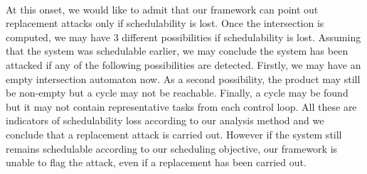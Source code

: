 ~\\
\noindent
At this onset, we would like to admit that our framework can point out replacement attacks only if schedulability is lost. Once the intersection is computed, we may have 3 different possibilities if schedulability is lost. Assuming that the system was schedulable earlier, we may conclude the system has been attacked if any of the following possibilities are detected. Firstly, we may have an empty intersection automaton now. As a second possibility, the product may still be non-empty but a cycle may not be reachable. Finally, a cycle may be found but it may not contain representative tasks from each control loop. All these are indicators of schedulability loss according to our analysis method and we conclude that a replacement attack is carried out. However if the system still remains schedulable according to our scheduling objective, our framework is unable to flag the attack, even if a replacement has been carried out.